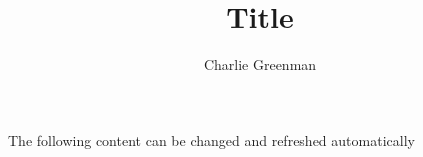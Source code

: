 \documentclass{article}
\title{Title}
\author{Charlie Greenman}
\begin{document}
\tableofcontents
The following content can be changed and refreshed automatically
\end{document}
